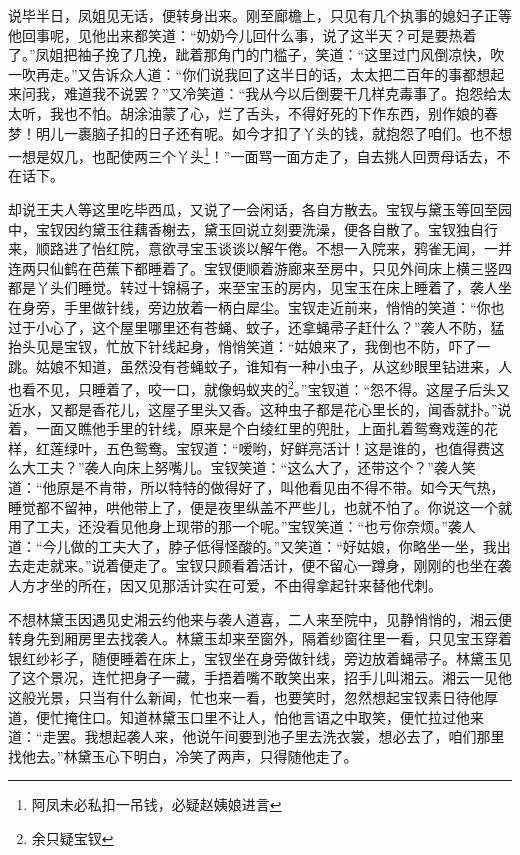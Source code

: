\documentclass[12pt,oneside]{book}
\begin{document}
说毕半日，凤姐见无话，便转身出来。刚至廊檐上，只见有几个执事的媳妇子正等他回事呢，见他出来都笑道：“奶奶今儿回什么事，说了这半天？可是要热着了。”凤姐把袖子挽了几挽，跐着那角门的门槛子，笑道：“这里过门风倒凉快，吹一吹再走。”又告诉众人道：“你们说我回了这半日的话，太太把二百年的事都想起来问我，难道我不说罢？”又冷笑道：“我从今以后倒要干几样克毒事了。抱怨给太太听，我也不怕。胡涂油蒙了心，烂了舌头，不得好死的下作东西，别作娘的春梦！明儿一裹脑子扣的日子还有呢。如今才扣了丫头的钱，就抱怨了咱们。也不想一想是奴几，也配使两三个丫头\footnote{阿凤未必私扣一吊钱，必疑赵姨娘进言}！”一面骂一面方走了，自去挑人回贾母话去，不在话下。

却说王夫人等这里吃毕西瓜，又说了一会闲话，各自方散去。宝钗与黛玉等回至园中，宝钗因约黛玉往藕香榭去，黛玉回说立刻要洗澡，便各自散了。宝钗独自行来，顺路进了怡红院，意欲寻宝玉谈谈以解午倦。不想一入院来，鸦雀无闻，一并连两只仙鹤在芭蕉下都睡着了。宝钗便顺着游廊来至房中，只见外间床上横三竖四都是丫头们睡觉。转过十锦槅子，来至宝玉的房内，见宝玉在床上睡着了，袭人坐在身旁，手里做针线，旁边放着一柄白犀尘。宝钗走近前来，悄悄的笑道：“你也过于小心了，这个屋里哪里还有苍蝇、蚊子，还拿蝇帚子赶什么？”袭人不防，猛抬头见是宝钗，忙放下针线起身，悄悄笑道：“姑娘来了，我倒也不防，吓了一跳。姑娘不知道，虽然没有苍蝇蚊子，谁知有一种小虫子，从这纱眼里钻进来，人也看不见，只睡着了，咬一口，就像蚂蚁夹的\footnote{余只疑宝钗}。”宝钗道：“怨不得。这屋子后头又近水，又都是香花儿，这屋子里头又香。这种虫子都是花心里长的，闻香就扑。”说着，一面又瞧他手里的针线，原来是个白绫红里的兜肚，上面扎着鸳鸯戏莲的花样，红莲绿叶，五色鸳鸯。宝钗道：“嗳哟，好鲜亮活计！这是谁的，也值得费这么大工夫？”袭人向床上努嘴儿。宝钗笑道：“这么大了，还带这个？”袭人笑道：“他原是不肯带，所以特特的做得好了，叫他看见由不得不带。如今天气热，睡觉都不留神，哄他带上了，便是夜里纵盖不严些儿，也就不怕了。你说这一个就用了工夫，还没看见他身上现带的那一个呢。”宝钗笑道：“也亏你奈烦。”袭人道：“今儿做的工夫大了，脖子低得怪酸的。”又笑道：“好姑娘，你略坐一坐，我出去走走就来。”说着便走了。宝钗只顾看着活计，便不留心一蹲身，刚刚的也坐在袭人方才坐的所在，因又见那活计实在可爱，不由得拿起针来替他代刺。

不想林黛玉因遇见史湘云约他来与袭人道喜，二人来至院中，见静悄悄的，湘云便转身先到厢房里去找袭人。林黛玉却来至窗外，隔着纱窗往里一看，只见宝玉穿着银红纱衫子，随便睡着在床上，宝钗坐在身旁做针线，旁边放着蝇帚子。林黛玉见了这个景况，连忙把身子一藏，手捂着嘴不敢笑出来，招手儿叫湘云。湘云一见他这般光景，只当有什么新闻，忙也来一看，也要笑时，忽然想起宝钗素日待他厚道，便忙掩住口。知道林黛玉口里不让人，怕他言语之中取笑，便忙拉过他来道：“走罢。我想起袭人来，他说午间要到池子里去洗衣裳，想必去了，咱们那里找他去。”林黛玉心下明白，冷笑了两声，只得随他走了。
\end{document}
